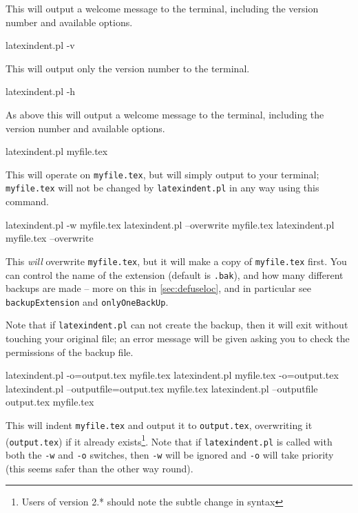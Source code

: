	This will output a welcome message to the terminal, including the version number and available options.

	\begin{commandshell}
latexindent.pl -v
      \end{commandshell}
	This will output only the version number to the terminal.


	\begin{commandshell}
latexindent.pl -h
      \end{commandshell}

	As above this will output a welcome message to the terminal, including the version number and available options.
	\begin{commandshell}
latexindent.pl myfile.tex
      \end{commandshell}

	This will operate on \texttt{myfile.tex}, but will simply output to your terminal; \texttt{myfile.tex} will	not be changed by \texttt{latexindent.pl} in any way using this command.

	\begin{commandshell}
latexindent.pl -w myfile.tex
latexindent.pl --overwrite myfile.tex
latexindent.pl myfile.tex --overwrite 
      \end{commandshell}

	This \emph{will} overwrite \texttt{myfile.tex}, but it will make a copy of \texttt{myfile.tex} first.
	You can control the name of the extension (default is \texttt{.bak}), and how many different backups are made -- more on this in \cref{sec:defuseloc}, and in particular see \texttt{backupExtension} and \texttt{onlyOneBackUp}.

	Note that if \texttt{latexindent.pl} can not create the backup, then it will exit without touching your original file; an error message will be given asking you to check the permissions of the backup file.

	\begin{commandshell} 
latexindent.pl -o=output.tex myfile.tex
latexindent.pl myfile.tex -o=output.tex 
latexindent.pl --outputfile=output.tex myfile.tex
latexindent.pl --outputfile output.tex myfile.tex
      \end{commandshell}

	This will indent \texttt{myfile.tex} and output it to \texttt{output.tex}, overwriting it (\texttt{output.tex}) if it already exists\footnote{Users of version 2.* should note the subtle change in syntax}.
	Note that if \texttt{latexindent.pl} is called with both the \texttt{-w} and \texttt{-o} switches, then \texttt{-w} will be ignored and \texttt{-o} will take priority (this seems safer than the other way round).

